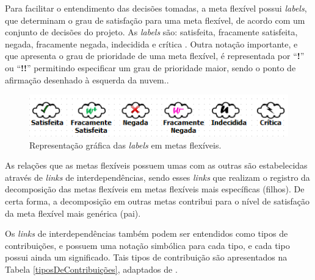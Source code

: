 Para facilitar o entendimento das decisões tomadas, a meta flexível possui \textit{labels}, que determinam o grau de satisfação para uma meta flexível, de acordo com um conjunto de decisões do projeto. As \textit{labels} são: satisfeita, fracamente satisfeita,  negada, fracamente negada, indecidida e crítica \cite{chung2012non}. Outra notação importante, e que apresenta o grau de prioridade de uma meta flexível, é representada por “\textbf{!}” ou “\textbf{!!}” permitindo especificar um grau de prioridade maior, sendo o ponto de afirmação desenhado à esquerda da nuvem..

\begin{figure}[h]
	\centering
	\includegraphics[keepaspectratio=true,scale=0.9]{figuras/labelsSoftgoals.png}
	\caption{Representação gráfica das \textit{labels} em metas flexíveis.}
	\label{fig02}
\end{figure} 

As relações que as metas flexíveis possuem umas com as outras são estabelecidas através de \textit{links} de interdependências, sendo esses \textit{links} que realizam o registro da decomposição das metas flexíveis em metas flexíveis mais específicas (filhos). De certa forma, a decomposição em outras metas contribui para o nível de satisfação da meta flexível mais genérica (pai).

Os \textit{links} de interdependências também podem ser entendidos como tipos de contribuições, e possuem uma notação simbólica para cada tipo, e cada tipo possui ainda um significado.  Tais tipos de contribuição são apresentados na Tabela \ref{tiposDeContribuições}, adaptados de  \cite{chung2012non}.




